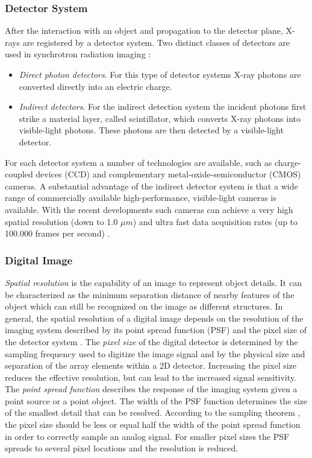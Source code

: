 \subsubsection*{Detector System}

After the interaction with an object and propagation to the detector plane, X-rays are registered by a detector system. Two distinct classes of detectors are used in synchrotron radiation imaging \cite{Gruner01}:
\begin{itemize}
  \item \textit{Direct photon detectors}.  For this type of detector systems X-ray photons are converted directly into an electric charge. 
  \item \textit{Indirect detectors}. For the indirect detection system the incident photons first strike a material layer, called scintillator, which converts X-ray photons into visible-light photons. These photons are then detected by a visible-light detector.  
\end{itemize}

For each detector system a number of technologies are available, such as charge-coupled devices (CCD) and complementary metal-oxide-semiconductor (CMOS) cameras.
A substantial advantage of the indirect detector system is that a wide range of commercially available high-performance, visible-light cameras is available. With the recent developments such cameras can achieve a very high spatial resolution (down to 1.0 $\mu m$) and ultra fast data acquisition rates (up to 100.000 frames per second) \cite{Rack10}.    


\subsubsection*{Digital Image}
\label{digital_image}

\textit{Spatial resolution} is the capability of an image to represent object details. It can be characterized as the minimum separation distance of nearby features of the object which can still be recognized on the image as different structures.  In general, the spatial resolution of a digital image depends on the resolution of the imaging system described by its point spread function (PSF) and the pixel size of the detector system \cite{Dougherty09}.
The \textit{pixel size} of the digital detector is determined by the sampling frequency used to digitize the image signal and by the physical size and separation of the array elements within a 2D detector. Increasing the pixel size reduces the effective resolution, but can lead to the increased signal sensitivity.
The \textit{point spread function} describes the response of the imaging system given a point source or a point object. The width of the PSF function determines the size of the smallest detail that can be resolved. According to the sampling theorem \cite{Nyquist28}, the pixel size should be less or equal half the width of the point spread function in order to correctly sample an analog signal. For smaller pixel sizes the PSF spreads to several pixel locations and the resolution is reduced.


